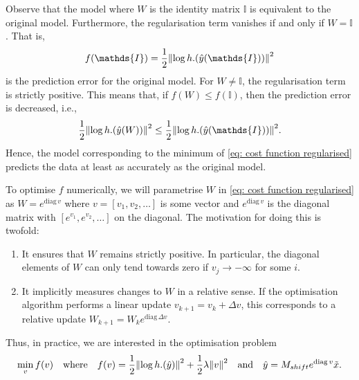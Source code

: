 \documentclass{article}
\begin{document}
Observe that the model where $W$ is the identity matrix $\mathds{I}$ is equivalent to the original model. Furthermore, the regularisation term vanishes if and only if $W = \mathds{I}$. That is,
$$
f(\mathds{I}) = \frac{1}{2}\norm{\log h.(\hat{y}(\mathds{I}))}^2
$$
is the prediction error for the original model.
For $W \ne \mathds{I}$, the regularisation term is strictly positive. This means that, if $f(W) \le f(\mathds{I})$, then the prediction error is decreased, i.e.,
$$
\frac{1}{2}\norm{\log h.(\hat{y}(W))}^2
\le
\frac{1}{2}\norm{\log h.(\hat{y}(\mathds{I}))}^2
.$$
Hence, the model corresponding to the minimum of \cref{eq: cost function regularised} predicts the data at least as accurately as the original model.

To optimise $f$ numerically, we will parametrise $W$ in \cref{eq: cost function regularised} as $W = e^{\mathrm{diag}\, v}$ where $v = [v_1, v_2,\dots]$ is some vector and $e^{\mathrm{diag}\, v}$ is the diagonal matrix with $[e^{v_1}, e^{v_2},\dots]$ on the diagonal. The motivation for doing this is twofold:
\begin{enumerate}
    \item It ensures that $W$ remains strictly positive. In particular, the diagonal elements of $W$ can only tend towards zero if $v_j \rightarrow -\infty$ for some $i$. 
    \item It implicitly measures changes to $W$ in a relative sense. If the optimisation algorithm performs a linear update $v_{k+1} = v_k + \Delta v$, this corresponds to a relative update $W_{k+1} = W_k e^{\mathrm{diag}\, \Delta v}$.
\end{enumerate}

Thus, in practice, we are interested in the optimisation problem
\begin{equation}
    \label{eq: cost function parameterised}
\min_{v} f(v)
\quad\text{where}\quad 
f(v)
=
\frac{1}{2}\norm{\log h.(\hat{y})}^2 + \frac{1}{2}\lambda \norm{v}^2
\quad\text{and}\quad 
\hat{y} = M_{shift} e^{\mathrm{diag}\, v} \tilde{x}
.\end{equation}
\end{document}
